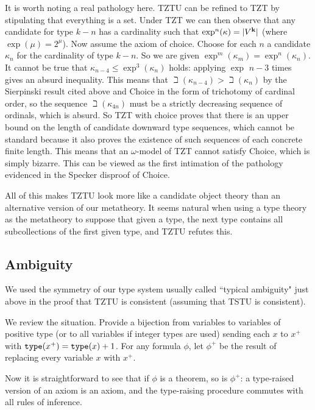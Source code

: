 \documentclass[12pt]{article}
\begin{document}
It is worth noting a real pathology here.  TZTU can be refined to TZT by stipulating that everything is a set.  Under TZT we can then observe that any candidate for type
$k-n$ has a cardinality such that $\exp^n(\kappa)= |V^{\bf k}|$ (where $\exp (\mu) = 2^\mu$).  Now assume the axiom of choice.  Choose for each $n$ a candidate $\kappa_n$ for
the cardinality of type $k-n$.    So we are given $\exp^m(\kappa_m) = \exp^n(\kappa_n)$.   It cannot be true that $\kappa_{n-4} \leq \exp^3(\kappa_n)$ holds:  applying $\exp$ $n-3$ times gives an absurd inequality.  This means that $\beth(\kappa_{n-4}) > \beth(\kappa_n)$ by the Sierpinski result cited above and Choice in the form of trichotomy of cardinal order,
so the sequence $\beth(\kappa_{4n})$ must be a strictly decreasing sequence of ordinals, which is absurd.  So TZT with choice proves that there is an upper bound on the length
of candidate downward type sequences, which cannot be standard because it also proves the existence of such sequences of each concrete finite length.  This means that an $\omega$-model of TZT cannot satisfy Choice, which is simply bizarre.  This can be viewed as the first intimation of the pathology evidenced in the Specker disproof of Choice.



All of this makes TZTU look more like a candidate object theory than an alternative version of our metatheory.  It seems natural when using a type theory as the metatheory to suppose that given a type, the next type contains all subcollections of the first given type, and TZTU refutes this.

\subsection{Ambiguity}

We used the symmetry of our type system usually called ``typical ambiguity" just above in the proof that TZTU is consistent (assuming that TSTU is consistent).

We review the situation.  Provide a bijection from variables to variables of positive type (or to all variables if integer types are used) sending each $x$ to $x^+$ with ${\tt type}(x^+) = {\tt type}(x)+1$.  For any formula
$\phi$, let $\phi^+$ be the result of replacing every variable $x$ with $x^+$.  

Now it is straightforward to see that if $\phi$ is a theorem, so is $\phi^+$:  a type-raised version of an axiom is an axiom, and the type-raising procedure commutes with all rules of inference.
\end{document}
